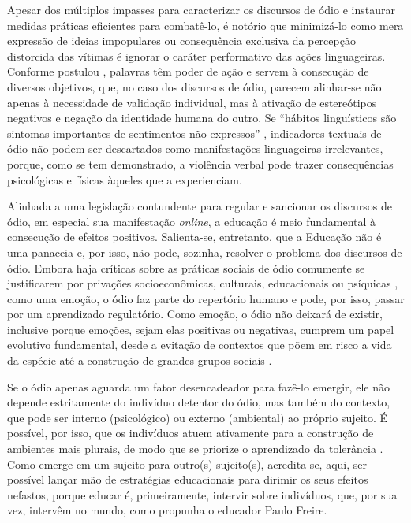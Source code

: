 \documentclass[portuguese]{textolivre}
\begin{document}
Apesar dos múltiplos impasses para caracterizar os discursos de ódio e instaurar medidas práticas eficientes para combatê-lo, é notório que minimizá-lo como mera expressão de ideias impopulares ou consequência exclusiva da percepção distorcida das vítimas é ignorar o caráter performativo das ações linguageiras. Conforme postulou \textcite{austin2009things}, palavras têm poder de ação e servem à consecução de diversos objetivos, que, no caso dos discursos de ódio, parecem alinhar-se não apenas à necessidade de validação individual, mas à ativação de estereótipos negativos e negação da identidade humana do outro. Se “hábitos linguísticos são sintomas importantes de sentimentos não expressos” \cite[p.23]{eco2022}, indicadores textuais de ódio não podem ser descartados como manifestações linguageiras irrelevantes, porque, como se tem demonstrado, a violência verbal pode trazer consequências psicológicas e físicas àqueles que a experienciam.

Alinhada a uma legislação contundente para regular e sancionar os discursos de ódio, em especial sua manifestação \emph{online}, a educação é meio fundamental à consecução de efeitos positivos. Salienta-se, entretanto, que a Educação não é uma panaceia e, por isso, não pode, sozinha, resolver o problema dos discursos de ódio. Embora haja críticas sobre as práticas sociais de ódio comumente se justificarem por privações socioeconômicas, culturais, educacionais ou psíquicas \cite{glucksmann2007}, como uma emoção, o ódio faz parte do repertório humano e pode, por isso, passar por um aprendizado regulatório. Como emoção, o ódio não deixará de existir, inclusive porque emoções, sejam elas positivas ou negativas, cumprem um papel evolutivo fundamental, desde a evitação de contextos que põem em risco a vida da espécie até a construção de grandes grupos sociais \cite{sebastian2018}.

Se o ódio apenas aguarda um fator desencadeador para fazê-lo emergir, ele não depende estritamente do indivíduo detentor do ódio, mas também do contexto, que pode ser interno (psicológico) ou externo (ambiental) ao próprio sujeito. É possível, por isso, que os indivíduos atuem ativamente para a construção de ambientes mais plurais, de modo que se priorize o aprendizado da tolerância \cite{eco2020migraccao}. Como emerge em um sujeito para outro(s) sujeito(s), acredita-se, aqui, ser possível lançar mão de estratégias educacionais para dirimir os seus efeitos nefastos, porque educar é, primeiramente, intervir sobre indivíduos, que, por sua vez, intervêm no mundo, como propunha o educador Paulo Freire.
\end{document}
